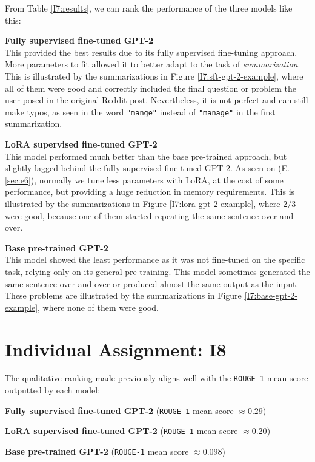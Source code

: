 \documentclass{article}
\begin{document}
From Table \ref{I7:results}, we can rank the performance of the three models like this:
\begin{arrowlist}
    \item \textbf{Fully supervised fine-tuned GPT-2} \\
    \hspace{2em}This provided the best results due to its fully supervised fine-tuning approach. More parameters to fit allowed it to better adapt to the task of \textit{summarization}. This is illustrated by the summarizations in Figure \ref{I7:sft-gpt-2-example}, where all of them were good and correctly included the final question or problem the user posed in the original Reddit post. Nevertheless, it is not perfect and can still make typos, as seen in the word \texttt{"mange"} instead of \texttt{"manage"} in the first summarization.

    \item \textbf{LoRA supervised fine-tuned GPT-2} \\
    \hspace{2em}This model performed much better than the base pre-trained approach, but slightly lagged behind the fully supervised fine-tuned GPT-2. As seen on (E.\ref{sec:e6}), normally we tune less parameters with LoRA, at the cost of some performance, but providing a huge reduction in memory requirements. This is illustrated by the summarizations in Figure \ref{I7:lora-gpt-2-example}, where $2/3$ were good, because one of them started repeating the same sentence over and over.

    \item \textbf{Base pre-trained GPT-2} \\
    \hspace{2em}This model showed the least performance as it was not fine-tuned on the specific task, relying only on its general pre-training. This model sometimes generated the same sentence over and over or produced almost the same output as the input. These problems are illustrated by the summarizations in Figure \ref{I7:base-gpt-2-example}, where none of them were good.
\end{arrowlist}

\section{Individual Assignment: I8}\label{sec:i8}
The qualitative ranking made previously aligns well with the \texttt{ROUGE-1} mean score outputted by each model:
\begin{arrowlist}
    \item \textbf{Fully supervised fine-tuned GPT-2} (\texttt{ROUGE-1} mean score $\approx 0.29$) 
    \item \textbf{LoRA supervised fine-tuned GPT-2} (\texttt{ROUGE-1} mean score $\approx 0.20$) 
    \item \textbf{Base pre-trained GPT-2} (\texttt{ROUGE-1} mean score $\approx 0.098$)
\end{arrowlist}
\end{document}
